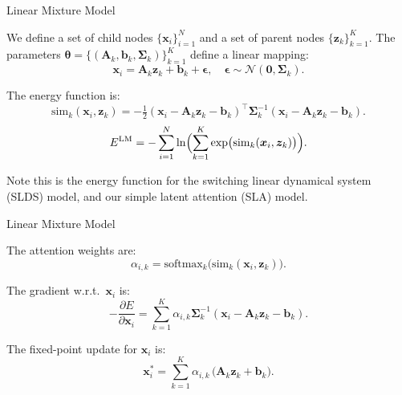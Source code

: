 \documentclass{beamer}
\begin{document}
\begin{frame}{Linear Mixture Model}

    We define a set of child nodes \(\{\bm{x}_i\}_{i=1}^N\) and a set of parent nodes \(\{\bm{z}_k\}_{k=1}^K\). The parameters \(\bm{\theta} = \{(\bm{A}_k, \bm{b}_k, \bm{\Sigma}_k)\}_{k=1}^K\) define a linear mapping:
    \[
    \bm{x}_i = \bm{A}_k \bm{z}_k + \bm{b}_k + \bm{\epsilon}, \quad \bm{\epsilon} \sim \mathcal{N}(\bm{0}, \bm{\Sigma}_k).
    \]

    \bigskip

    The energy function is:
    \[
    \mathrm{sim}_k(\bm{x}_i, \bm{z}_k)
    =
    -\tfrac{1}{2} (\bm{x}_i - \bm{A}_k \bm{z}_k - \bm{b}_k)^\top \bm{\Sigma}_k^{-1} (\bm{x}_i - \bm{A}_k \bm{z}_k - \bm{b}_k).
    \]
    \[
    E^{\mathrm{LM}}
    =
    -\sum_{i=1}^{N}
    \ln \Bigl(\sum_{k=1}^K
    \exp\bigl(\mathrm{sim}_k(\bm{x}_i, \bm{z}_k)\bigr)\Bigr).
    \]

    Note this is the energy function for the switching linear dynamical system (SLDS) model, and our simple latent attention (SLA) model.

\end{frame}

\begin{frame}{Linear Mixture Model}

    The attention weights are:
    \[
    \alpha_{i,k} = \mathrm{softmax}_k\bigl(\mathrm{sim}_k(\bm{x}_i, \bm{z}_k)\bigr).
    \]

    The gradient w.r.t.\ \(\bm{x}_i\) is:
    \[
    -\frac{\partial E}{\partial \bm{x}_i}
    =
    \sum_{k=1}^{K} \alpha_{i,k} \bm{\Sigma}_k^{-1} (\bm{x}_i - \bm{A}_k \bm{z}_k - \bm{b}_k).
    \]

    The fixed-point update for \(\bm{x}_i\) is:
    \[
    \bm{x}_i^* =
    \sum_{k=1}^K \alpha_{i,k}\,\bigl(\bm{A}_k \bm{z}_k + \bm{b}_k\bigr).
    \]

\end{frame}
\end{document}
